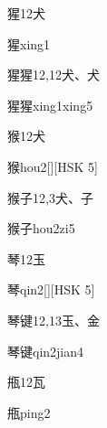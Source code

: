 \begin{Entry}{猩}{12}{⽝}
  \begin{Phonetics}{猩}{xing1}
  \end{Phonetics}
\end{Entry}

\begin{Entry}{猩猩}{12,12}{⽝、⽝}
  \begin{Phonetics}{猩猩}{xing1xing5}
  \end{Phonetics}
\end{Entry}

\begin{Entry}{猴}{12}{⽝}
  \begin{Phonetics}{猴}{hou2}[][HSK 5]
  \end{Phonetics}
\end{Entry}

\begin{Entry}{猴子}{12,3}{⽝、⼦}
  \begin{Phonetics}{猴子}{hou2zi5}
  \end{Phonetics}
\end{Entry}

\begin{Entry}{琴}{12}{⽟}
  \begin{Phonetics}{琴}{qin2}[][HSK 5]
  \end{Phonetics}
\end{Entry}

\begin{Entry}{琴键}{12,13}{⽟、⾦}
  \begin{Phonetics}{琴键}{qin2jian4}
  \end{Phonetics}
\end{Entry}

\begin{Entry}{甁}{12}{⽡}
  \begin{Phonetics}{甁}{ping2}
  \end{Phonetics}
\end{Entry}

